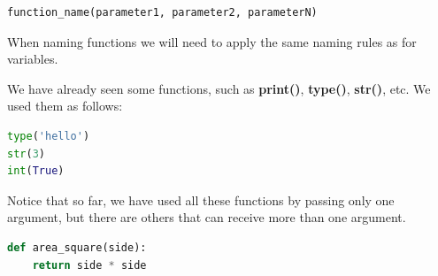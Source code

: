 \documentclass{tufte-handout}
\begin{document}
\begin{lstlisting}[language=Python]
function_name(parameter1, parameter2, parameterN)
\end{lstlisting}

When naming functions we will need to apply the same naming rules as
for variables.

We have already seen some functions, such as \textbf{print()},
\textbf{type()}, \textbf{str()}, etc.  We used them as follows:

\begin{lstlisting}[language=Python]
type('hello')
str(3)
int(True)
\end{lstlisting}

Notice that so far, we have used all these functions by passing only
one argument, but there are others that can receive more than one
argument.

\begin{lstlisting}[language=Python]
def area_square(side):
    return side * side
\end{lstlisting}

\pagebreak



\end{document}
